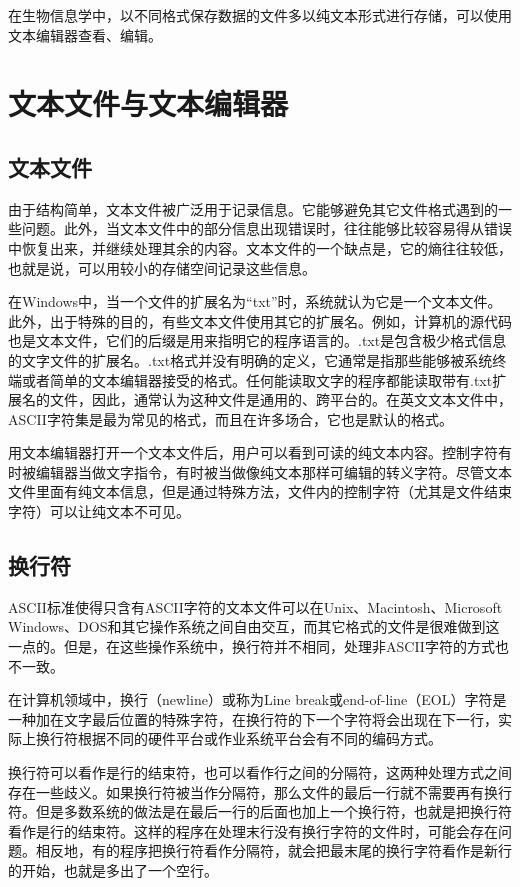 \documentclass[11pt,a4paper,twoside]{book}
\begin{document}
在生物信息学中，以不同格式保存数据的文件多以纯文本形式进行存储，可以使用文本编辑器查看、编辑。

\section{文本文件与文本编辑器}
\subsection{文本文件}
由于结构简单，文本文件被广泛用于记录信息。它能够避免其它文件格式遇到的一些问题。此外，当文本文件中的部分信息出现错误时，往往能够比较容易得从错误中恢复出来，并继续处理其余的内容。文本文件的一个缺点是，它的熵往往较低，也就是说，可以用较小的存储空间记录这些信息。

在Windows中，当一个文件的扩展名为“txt”时，系统就认为它是一个文本文件。此外，出于特殊的目的，有些文本文件使用其它的扩展名。例如，计算机的源代码也是文本文件，它们的后缀是用来指明它的程序语言的。.txt是包含极少格式信息的文字文件的扩展名。.txt格式并没有明确的定义，它通常是指那些能够被系统终端或者简单的文本编辑器接受的格式。任何能读取文字的程序都能读取带有.txt扩展名的文件，因此，通常认为这种文件是通用的、跨平台的。在英文文本文件中，ASCII字符集是最为常见的格式，而且在许多场合，它也是默认的格式。

用文本编辑器打开一个文本文件后，用户可以看到可读的纯文本内容。控制字符有时被编辑器当做文字指令，有时被当做像纯文本那样可编辑的转义字符。尽管文本文件里面有纯文本信息，但是通过特殊方法，文件内的控制字符（尤其是文件结束字符）可以让纯文本不可见。

\subsection{换行符}
ASCII标准使得只含有ASCII字符的文本文件可以在Unix、Macintosh、Microsoft Windows、DOS和其它操作系统之间自由交互，而其它格式的文件是很难做到这一点的。但是，在这些操作系统中，换行符并不相同，处理非ASCII字符的方式也不一致。

在计算机领域中，换行（newline）或称为Line break或end-of-line（EOL）字符是一种加在文字最后位置的特殊字符，在换行符的下一个字符将会出现在下一行，实际上换行符根据不同的硬件平台或作业系统平台会有不同的编码方式。

换行符可以看作是行的结束符，也可以看作行之间的分隔符，这两种处理方式之间存在一些歧义。如果换行符被当作分隔符，那么文件的最后一行就不需要再有换行符。但是多数系统的做法是在最后一行的后面也加上一个换行符，也就是把换行符看作是行的结束符。这样的程序在处理末行没有换行字符的文件时，可能会存在问题。相反地，有的程序把换行符看作分隔符，就会把最末尾的换行字符看作是新行的开始，也就是多出了一个空行。
\end{document}
